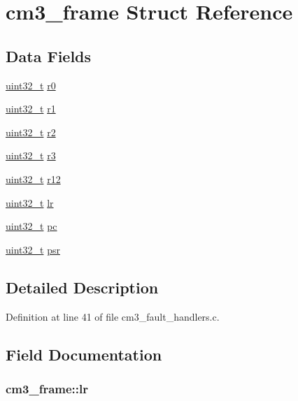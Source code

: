 \hypertarget{structcm3__frame}{\section{cm3\-\_\-frame Struct Reference}
\label{structcm3__frame}
}
\subsection*{Data Fields}
\begin{DoxyCompactItemize}
\item 
\hyperlink{stdint_8h_a435d1572bf3f880d55459d9805097f62}{uint32\-\_\-t} \hyperlink{structcm3__frame_a183f1c71c82446beaa80b9aaefe31650}{r0}
\item 
\hyperlink{stdint_8h_a435d1572bf3f880d55459d9805097f62}{uint32\-\_\-t} \hyperlink{structcm3__frame_ac9b99b04d32c6f516cbea10105bf7186}{r1}
\item 
\hyperlink{stdint_8h_a435d1572bf3f880d55459d9805097f62}{uint32\-\_\-t} \hyperlink{structcm3__frame_a8777f448e55dd8b65d3d0287464677cb}{r2}
\item 
\hyperlink{stdint_8h_a435d1572bf3f880d55459d9805097f62}{uint32\-\_\-t} \hyperlink{structcm3__frame_ab5455c3ad56bb80375a224fd34f0b1dd}{r3}
\item 
\hyperlink{stdint_8h_a435d1572bf3f880d55459d9805097f62}{uint32\-\_\-t} \hyperlink{structcm3__frame_a58e30011b89d86345e64966b61fdce95}{r12}
\item 
\hyperlink{stdint_8h_a435d1572bf3f880d55459d9805097f62}{uint32\-\_\-t} \hyperlink{structcm3__frame_a83e160007fe87e8ef571d55f74f005a6}{lr}
\item 
\hyperlink{stdint_8h_a435d1572bf3f880d55459d9805097f62}{uint32\-\_\-t} \hyperlink{structcm3__frame_a2592e72a1b369dbe1297c6e313ffb769}{pc}
\item 
\hyperlink{stdint_8h_a435d1572bf3f880d55459d9805097f62}{uint32\-\_\-t} \hyperlink{structcm3__frame_a72f11d5d0eaff3a7684af9aa42531738}{psr}
\end{DoxyCompactItemize}


\subsection{Detailed Description}


Definition at line 41 of file cm3\-\_\-fault\-\_\-handlers.\-c.



\subsection{Field Documentation}
\hypertarget{structcm3__frame_a83e160007fe87e8ef571d55f74f005a6}{
\subsubsection[{lr}]{ cm3\-\_\-frame\-::lr}}\label{structcm3__frame_a83e160007fe87e8ef571d55f74f005a6}


